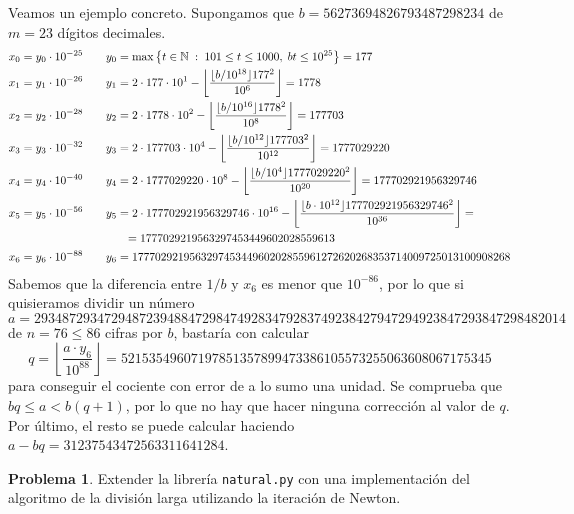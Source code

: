 \documentclass[a4paper, 11pt]{article}
\newcommand{\NN}{\mathbb{N}}
\newcounter{numerodetema}
\theoremstyle{plain}
\theoremstyle{definition}
\newtheorem{prob}{Problema}[numerodetema]
\begin{document}
Veamos un ejemplo concreto. Supongamos que $b=56273694826793487298234$ de $m=23$
dígitos decimales.
\[
\begin{aligned}
   x_0 &=y_0\cdot 10^{-25}\qquad
   y_0=\max\left\{t\in\NN\;:\;101\leq t\leq 1000,\;bt\leq 10^{25}\right\}=177 \\
   x_1 &=y_1\cdot 10^{-26}\qquad
   y_1=2\cdot177\cdot10^1-
   \left\lfloor\frac{\lfloor b/10^{18}\rfloor 177^2}{10^6}\right\rfloor=1778 \\
   x_2 &=y_2\cdot 10^{-28}\qquad
   y_2=2\cdot1778\cdot10^2-
   \left\lfloor\frac{\lfloor b/10^{16}\rfloor 1778^2}{10^8}\right\rfloor=177703 \\
   x_3 &=y_3\cdot 10^{-32}\qquad
   y_3=2\cdot177703\cdot10^4-
   \left\lfloor
     \frac{\lfloor b/10^{12}\rfloor 177703^2}{10^{12}}
   \right\rfloor=1777029220 \\
   x_4 &=y_4\cdot 10^{-40}\qquad
   y_4=2\cdot1777029220\cdot10^8-
   \left\lfloor
     \frac{\lfloor b/10^{4}\rfloor 1777029220^2}{10^{20}}
   \right\rfloor= 177702921956329746\\
   x_5 &=y_5\cdot 10^{-56}\qquad
   y_5=2\cdot177702921956329746\cdot10^{16}-
   \left\lfloor
     \frac{\lfloor b\cdot 10^{12}\rfloor 177702921956329746^2}{10^{36}}
   \right\rfloor= \\
   & \hspace{3.2cm} =1777029219563297453449602028559613 \\
   x_6 &=y_6\cdot 10^{-88}\qquad
   y_6=177702921956329745344960202855961272620268353714009725013100908268   
\end{aligned}
\]
Sabemos que la diferencia entre $1/b$ y $x_6$ es menor que $10^{-86}$, por lo
que si quisieramos dividir un número
\[
a=2934872934729487239488472984749283479283749238427947294923847293847298482014
\]
de $n=76\leq86$ cifras por $b$, bastaría con calcular
\[
q=\left\lfloor\frac{a\cdot y_6}{10^{88}}\right\rfloor=
52153549607197851357899473386105573255063608067175345
\]
para conseguir el cociente con error de a lo sumo una unidad. Se comprueba que
$bq\leq a<b(q+1)$, por lo que no hay que hacer ninguna corrección al valor de
$q$. Por último, el resto se puede calcular haciendo
$a-bq=31237543472563311641284$.

\bigskip

\begin{prob}
Extender la librería \texttt{natural.py} con una implementación del algoritmo
de la división larga utilizando la iteración de Newton.
\end{prob}
\end{document}
